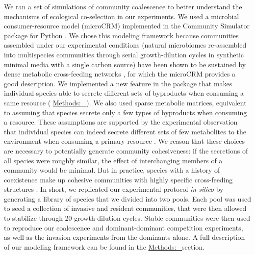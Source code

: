 \documentclass[a4paper,10pt]{article}
\newcommand{\methodsref}[1]{%
  \hyperref[{methods:#1}]{%
   Methods:~\nameref*{methods:#1}%
  }%
}
\begin{document}
We ran a set of simulations of community coalescence to better understand the mechanisms
of ecological co-selection in our experiments. We used a microbial consumer-resource
model (microCRM) \cite{Goldford2018,Marsland2019} implemented in the Community Simulator package
for Python \cite{Marsland2020}. We chose this modeling framework because
communities assembled under our experimental conditions (natural microbiomes re-assembled into
multispecies communities through serial growth-dilution cycles in synthetic minimal media
with a single carbon source)
have been shown to be
sustained by dense metabolic cross-feeding networks \cite{Goldford2018}, for which the
microCRM provides a good description.
We implemented a new feature in the package that makes individual species
able to secrete different sets of byproducts when consuming a same resource
(\methodsref{sim}).
We also used sparse metabolic matrices, equivalent to assuming that species secrete only a few
types of byproducts when consuming a resource. These assumptions are supported by the experimental
observation that individual species can indeed secrete different sets of few metabolites
to the environment when consuming a primary resource
\cite{Harcombe2014,Pinu2018}.
We reason that these choices are necessary to potentially generate community cohesiveness:
if the secretions of all species were roughly similar, the effect of interchanging members of
a community would be minimal. But in practice, species with a history of coexistence make up
cohesive communities with highly specific cross-feeding structures \cite{Goldford2018,Estrela2020}.
In short,
we replicated our experimental protocol \textit{in silico}
by generating a library of species that we divided into two pools. Each pool was used to seed a
collection of invasive and resident communities, that were then allowed to stabilize through 20
growth-dilution cycles. Stable communities were then used to reproduce our coalescence
and dominant-dominant competition experiments,
as well as the invasion experiments from the dominants alone.
A full description of our modeling framework can be found in the \methodsref{sim} section.
\end{document}
